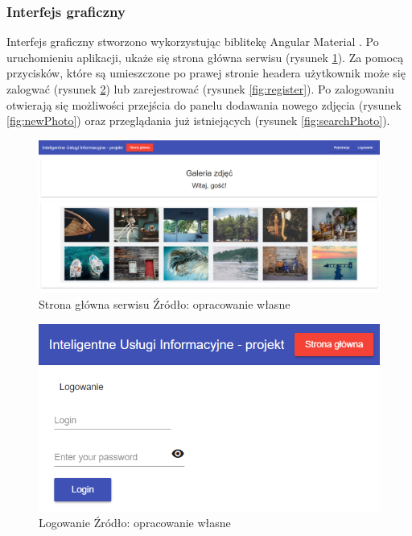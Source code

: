 \subsubsection{Interfejs graficzny}
Interfejs graficzny stworzono wykorzystując biblitekę Angular Material . Po
uruchomieniu aplikacji, ukaże się strona główna serwisu (rysunek \ref{fig:welcome}). Za pomocą przycisków, które są umieszczone po prawej stronie headera użytkownik może się zalogwać (rysunek \ref{fig:login}) lub zarejestrować (rysunek \ref{fig:register}). Po zalogowaniu otwierają się możliwości przejścia do panelu dodawania nowego zdjęcia (rysunek \ref{fig:newPhoto}) oraz przeglądania już istniejących (rysunek \ref{fig:searchPhoto}).
\begin{figure}
	\centering
	\includegraphics[width = 15cm]{images/e_g.png}
	\caption{Strona główna serwisu
		\newline Źródło: opracowanie własne}
	\label{fig:welcome}
\end{figure}
\begin{figure}
	\centering
	\includegraphics[width = 15cm]{images/logowanie.png}
	\caption{Logowanie
		\newline Źródło: opracowanie własne}
	\label{fig:login}
\end{figure}
